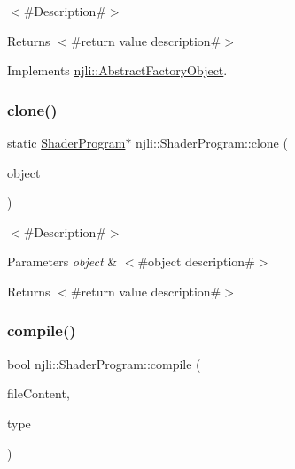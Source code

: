 $<$\#\+Description\#$>$

\begin{DoxyReturn}{Returns}
$<$\#return value description\#$>$ 
\end{DoxyReturn}


Implements \mbox{\hyperlink{classnjli_1_1_abstract_factory_object_a4763d05bc9dc37c559111f8bb30e1dd8}{njli\+::\+Abstract\+Factory\+Object}}.

\mbox{\label{classnjli_1_1_shader_program_a65c36d0386ef8a58f55d14918d0d8096}} 
\subsubsection{\texorpdfstring{clone()}{clone()}}
{\footnotesize\ttfamily static \mbox{\hyperlink{classnjli_1_1_shader_program}{Shader\+Program}}$\ast$ njli\+::\+Shader\+Program\+::clone (\begin{DoxyParamCaption}\item[{const \mbox{\hyperlink{classnjli_1_1_shader_program}{Shader\+Program}} \&}]{object }\end{DoxyParamCaption})\hspace{0.3cm}{\ttfamily [static]}}

$<$\#\+Description\#$>$


\begin{DoxyParams}{Parameters}
{\em object} & $<$\#object description\#$>$\\
\hline
\end{DoxyParams}
\begin{DoxyReturn}{Returns}
$<$\#return value description\#$>$ 
\end{DoxyReturn}
\mbox{\label{classnjli_1_1_shader_program_a5a6c623a0321cfc305b6edc6e514b049}} 
\subsubsection{\texorpdfstring{compile()}{compile()}}
{\footnotesize\ttfamily bool njli\+::\+Shader\+Program\+::compile (\begin{DoxyParamCaption}\item[{const char $\ast$}]{file\+Content,  }\item[{\mbox{\hyperlink{namespacenjli_a8f2b6cfac9213576c34bcf711ac39fbd}{njli\+Shader\+Type}}}]{type }\end{DoxyParamCaption})}

